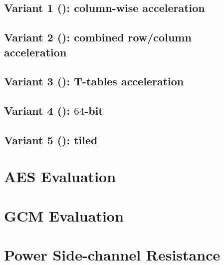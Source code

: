 \documentclass[preprint]{iacrtrans}
\begin{document}
\subsection{Variant 1 (): column-wise acceleration}
\label{sec:design:v1}


\subsection{Variant 2 (): combined row/column acceleration}
\label{sec:design:v2}


\subsection{Variant 3 (): T-tables acceleration}
\label{sec:design:v3}


\subsection{Variant 4 (): $64$-bit}
\label{sec:design:v4}


\subsection{Variant 5 (): tiled}
\label{sec:design:v5}



\section{AES Evaluation}
\label{sec:eval}




\section{GCM Evaluation}
\label{sec:eval:gcm}



\section{Power Side-channel Resistance}
\label{sec:psca}

\end{document}
